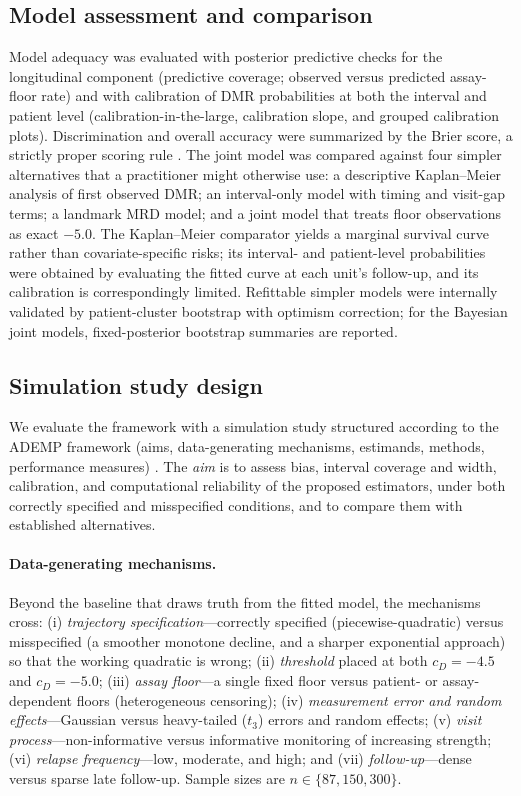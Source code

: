 \documentclass[11pt]{article}
\begin{document}
\subsection{Model assessment and comparison}
\label{sec:assessment}

Model adequacy was evaluated with posterior predictive checks for the
longitudinal component (predictive coverage; observed versus predicted
assay-floor rate) and with calibration of DMR probabilities at both the
interval and patient level (calibration-in-the-large, calibration slope,
and grouped calibration plots). Discrimination and overall accuracy were
summarized by the Brier score, a strictly proper scoring rule
\cite{GneitingRaftery2007ProperScoring}. The joint model was compared against four
simpler alternatives that a practitioner might otherwise use: a
descriptive Kaplan--Meier analysis of first observed DMR; an interval-only
model with timing and visit-gap terms; a landmark MRD model; and a joint
model that treats floor observations as exact $-5.0$. The Kaplan--Meier
comparator yields a marginal survival curve rather than covariate-specific
risks; its interval- and patient-level probabilities were obtained by
evaluating the fitted curve at each unit's follow-up, and its calibration is
correspondingly limited. Refittable simpler models were internally validated
by patient-cluster bootstrap with optimism correction; for the Bayesian joint
models, fixed-posterior bootstrap summaries are reported.

\subsection{Simulation study design}
\label{sec:sim}

We evaluate the framework with a simulation study structured according to the
ADEMP framework (aims, data-generating mechanisms, estimands, methods,
performance measures) \cite{GneitingRaftery2007ProperScoring}. The
\emph{aim} is to assess bias, interval coverage and width, calibration, and
computational reliability of the proposed estimators, under both correctly
specified and misspecified conditions, and to compare them with established
alternatives.

\paragraph{Data-generating mechanisms.} Beyond the baseline that draws truth
from the fitted model, the mechanisms cross: (i) \emph{trajectory
specification}---correctly specified (piecewise-quadratic) versus misspecified
(a smoother monotone decline, and a sharper exponential approach) so that the
working quadratic is wrong; (ii) \emph{threshold} placed at both $c_D=-4.5$ and
$c_D=-5.0$; (iii) \emph{assay floor}---a single fixed floor versus
patient- or assay-dependent floors (heterogeneous censoring); (iv)
\emph{measurement error and random effects}---Gaussian versus heavy-tailed
($t_3$) errors and random effects; (v) \emph{visit process}---non-informative
versus informative monitoring of increasing strength; (vi) \emph{relapse
frequency}---low, moderate, and high; and (vii) \emph{follow-up}---dense versus
sparse late follow-up. Sample sizes are $n\in\{87,150,300\}$.
\end{document}
